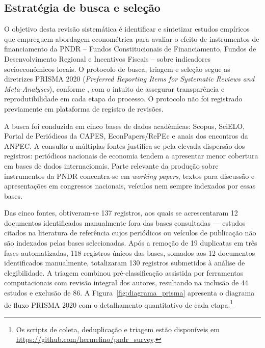 
\subsection{Estratégia de busca e seleção}
\label{subsec:metodo-estrategia-busca}

O objetivo desta revisão sistemática é identificar e sintetizar estudos empíricos que empreguem abordagem econométrica para avaliar o efeito de instrumentos de financiamento da PNDR -- Fundos Constitucionais de Financiamento, Fundos de Desenvolvimento Regional e Incentivos Fiscais -- sobre indicadores socioeconômicos locais. O protocolo de busca, triagem e seleção segue as diretrizes PRISMA 2020 (\textit{Preferred Reporting Items for Systematic Reviews and Meta-Analyses}), conforme , com o intuito de assegurar transparência e reprodutibilidade em cada etapa do processo. O protocolo não foi registrado previamente em plataforma de registro de revisões.

A busca foi conduzida em cinco bases de dados acadêmicas: Scopus, SciELO, Portal de Periódicos da CAPES, EconPapers/RePEc e anais dos encontros da ANPEC. A consulta a múltiplas fontes justifica-se pela elevada dispersão dos registros: periódicos nacionais de economia tendem a apresentar menor cobertura em bases de dados internacionais. Parte relevante da produção sobre instrumentos da PNDR concentra-se em \textit{working papers}, textos para discussão e apresentações em congressos nacionais, veículos nem sempre indexados por essas bases.

Das cinco fontes, obtiveram-se 137 registros, aos quais se acrescentaram 12 documentos identificados manualmente fora das bases consultadas --- estudos citados na literatura de referência cujos periódicos ou veículos de publicação não são indexados pelas bases selecionadas. Após a remoção de 19 duplicatas em três fases automatizadas, 118 registros únicos das bases, somados aos 12 documentos identificados manualmente, totalizaram 130 registros submetidos à análise de elegibilidade. A triagem combinou pré-classificação assistida por ferramentas computacionais com revisão integral dos autores, resultando na inclusão de 44 estudos e exclusão de 86. A Figura~\ref{fig:diagrama_prisma} apresenta o diagrama de fluxo PRISMA 2020 com o detalhamento quantitativo de cada etapa.\footnote{Os scripts de coleta, deduplicação e triagem estão disponíveis em \url{https://github.com/hermelino/pndr_survey}.}

